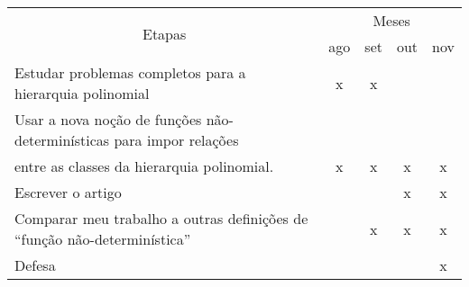 \documentclass[12pt]{letter}
\begin{document}
\begin{tabularx}{\linewidth}{|X|*{4}{c|}}
    \hline
    \multicolumn{1}{|c|}{\multirow{2}{*}{Etapas}} & \multicolumn{4}{|c|}{Meses}\\

    \cline{2-5}
    & ago & set & out & nov \\ \hline

    Estudar problemas completos para a hierarquia polinomial
    &  x  &  x  &     &     \\ \hline

    Usar a nova noção de funções não-determinísticas para impor relações &&&&\\
    entre as classes da hierarquia polinomial.
    &  x  &  x  &  x  &   x \\ \hline

    Escrever o artigo
    &     &     &  x  &  x  \\ \hline

    Comparar meu trabalho a outras definições de ``função não-determinística''
    &     &  x  &  x  &  x  \\ \hline

    Defesa
    &     &     &     &  x  \\ \hline
\end{tabularx}

\begin{centering}


\end{centering}
\end{document}
